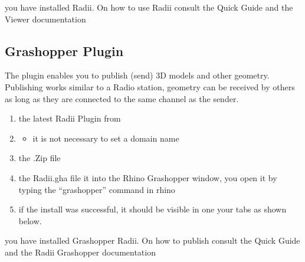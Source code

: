 \documentclass[letterpaper,10pt,english]{sphinxmanual}
\begin{document}
\noindent{}

\sphinxAtStartPar
{} you have installed Radii. On how to use Radii consult the Quick Guide and the Viewer documentation


\subsection{Grashopper Plugin}
\label{\detokenize{tutorial/Setup/install_setup:grashopper-plugin}}
\sphinxAtStartPar
The plugin enables you to publish (send) 3D models and other geometry.
Publishing works similar to a Radio station, geometry can be received by others as long as they are connected
to the same channel as the sender.
\begin{enumerate}
%
\item {} 
\sphinxAtStartPar
{} the latest Radii Plugin from 

\item {} \begin{description}
\begin{itemize}
\item {} 
\sphinxAtStartPar
it is not necessary to set a domain name

\end{itemize}

\end{description}

\item {} 
\sphinxAtStartPar
{} the .Zip file

\item {} 
\sphinxAtStartPar
{} the Radii.gha file it into the Rhino Grashopper window, you open it by typing the “grashopper” command in rhino

\item {} 
\sphinxAtStartPar
{} if the install was successful, it should be visible in one your tabs as shown below.

\end{enumerate}

\noindent{}

\sphinxAtStartPar
{} you have installed Grashopper Radii. On how to publish consult the Quick Guide and the Radii Grashopper documentation
\end{document}
